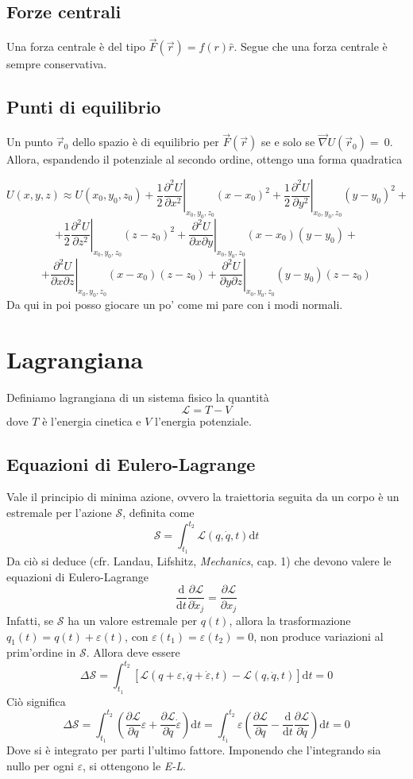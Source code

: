 \documentclass[a4paper,11pt]{article}
\begin{document}
\subsection{Forze centrali}

\noindent Una forza centrale è del tipo $\vec{F}(\vec{r})=f(r)\hat{r}$. Segue che una forza centrale è sempre conservativa.

\subsection{Punti di equilibrio}

\noindent Un punto $\vec{r}_0$ dello spazio è di equilibrio per $\vec{F}(\vec{r})$ se e solo se $\vec{\nabla}U(\vec{r}_0)=~0$. Allora, espandendo il potenziale al secondo ordine, ottengo una forma quadratica

$$U(x,y,z)\approx U(x_0,y_0,z_0)+\frac{1}{2}\left.\frac{\partial^2U}{\partial x^2}\right|_{x_0,y_0,z_0}(x-x_0)^2+\left.\frac{1}{2}\frac{\partial^2U}{\partial y^2}\right|_{x_0,y_0,z_0}(y-y_0)^2+$$
$$+\left.\frac{1}{2}\frac{\partial^2U}{\partial z^2}\right|_{x_0,y_0,z_0}(z-z_0)^2+\left.\frac{\partial^2U}{\partial x\partial y}\right|_{x_0,y_0,z_0}(x-x_0)(y-y_0)+$$ $$+\left.\frac{\partial^2U}{\partial x\partial z}\right|_{x_0,y_0,z_0}(x-x_0)(z-z_0)+\left.\frac{\partial^2U}{\partial y\partial z}\right|_{x_0,y_0,z_0}(y-y_0)(z-z_0)$$
Da qui in poi posso giocare un po' come mi pare con i modi normali.

\newpage
\section{Lagrangiana}
Definiamo lagrangiana di un sistema fisico la quantità
$$\mathcal{L}=T-V$$
dove $T$ è l'energia cinetica e $V$ l'energia potenziale.
\subsection{Equazioni di Eulero-Lagrange}
Vale il principio di minima azione, ovvero la traiettoria seguita da un corpo è un estremale per l'azione $\mathcal{S}$, definita come
$$\mathcal{S}=\int_{t_1}^{t_2}\mathcal{L}(q,\dot{q}, t)\mathrm{d}t$$
Da ciò si deduce (cfr. Landau, Lifshitz, \textit{Mechanics}, cap. 1) che devono valere le equazioni di Eulero-Lagrange
$$\frac{\mathrm{d}}{\mathrm{d}t}\frac{\partial\mathcal{L}}{\partial\dot{x}_j}=\frac{\partial\mathcal{L}}{\partial x_j}$$
Infatti, se $\mathcal{S}$ ha un valore estremale per $q(t)$, allora la trasformazione $q_1(t)=q(t)+\varepsilon(t)$, con $\varepsilon(t_1)=\varepsilon(t_2)=0$, non produce variazioni al prim'ordine in $\mathcal{S}$. Allora deve essere
$$\Delta\mathcal{S}=\int_{t_1}^{t_2}\left[\mathcal{L}(q+\varepsilon,\dot{q}+\dot{\varepsilon}, t)-\mathcal{L}(q,\dot{q}, t)\right]\mathrm{d}t=0$$
Ciò significa
$$\Delta\mathcal{S}=\int_{t_1}^{t_2}\left(\frac{\partial\mathcal{L}}{\partial q}\varepsilon+\frac{\partial \mathcal{L}}{\partial\dot{q}}\dot{\varepsilon}\right)\mathrm{d}t=\int_{t_1}^{t_2}\varepsilon\left(\frac{\partial\mathcal{L}}{\partial q}-\frac{\mathrm{d}}{\mathrm{d}t}\frac{\partial \mathcal{L}}{\partial\dot{q}}\right)\mathrm{d}t=0$$
Dove si è integrato per parti l'ultimo fattore. Imponendo che l'integrando sia nullo per ogni $\varepsilon$, si ottengono le \textit{E-L}.
\end{document}
